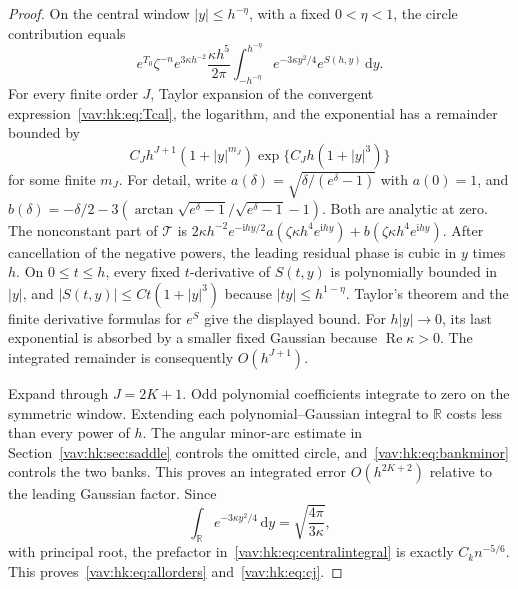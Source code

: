 \documentclass[11pt]{article}
\theoremstyle{remark}\newtheorem{remark}[theorem]{Remark}
\newcommand{\ii}{\mathrm i}
\newcommand{\dd}{\,\mathrm d}
\newcommand{\Rea}{\operatorname{Re}}
\newcommand{\R}{\mathbb R}
\begin{document}
\begin{proof}
On the central window $|y|\leq h^{-\eta}$, with a fixed $0<\eta<1$, the circle contribution equals
\begin{equation}\label{vav:hk:eq:centralintegral}
 e^{T_0}\zeta^{-n}e^{3\kappa h^{-2}}
 \frac{\kappa h^5}{2\pi}
 \int_{-h^{-\eta}}^{h^{-\eta}}
 e^{-3\kappa y^2/4}e^{S(h,y)}\dd y.
\end{equation}
For every finite order $J$, Taylor expansion of the convergent expression~\eqref{vav:hk:eq:Tcal}, the logarithm, and the exponential has a remainder bounded by
\[
 C_Jh^{J+1}(1+|y|^{m_J})
 \exp\{C_Jh(1+|y|^3)\}
\]
for some finite $m_J$. For detail, write $a(\delta)=\sqrt{\delta/(e^\delta-1)}$ with $a(0)=1$, and $b(\delta)=-\delta/2-3(\arctan\sqrt{e^\delta-1}/\sqrt{e^\delta-1}-1)$. Both are analytic at zero. The nonconstant part of $\mathcal T$ is $2\kappa h^{-2}e^{-\ii hy/2}a(\zeta\kappa h^4e^{\ii hy})+b(\zeta\kappa h^4e^{\ii hy})$. After cancellation of the negative powers, the leading residual phase is cubic in $y$ times $h$. On $0\leq t\leq h$, every fixed $t$-derivative of $S(t,y)$ is polynomially bounded in $|y|$, and $|S(t,y)|\leq Ct(1+|y|^3)$ because $|ty|\leq h^{1-\eta}$. Taylor's theorem and the finite derivative formulas for $e^S$ give the displayed bound. For $h|y|\to0$, its last exponential is absorbed by a smaller fixed Gaussian because $\Rea\kappa>0$. The integrated remainder is consequently $O(h^{J+1})$.

Expand through $J=2K+1$. Odd polynomial coefficients integrate to zero on the symmetric window. Extending each polynomial--Gaussian integral to $\R$ costs less than every power of $h$. The angular minor-arc estimate in Section~\ref{vav:hk:sec:saddle} controls the omitted circle, and~\eqref{vav:hk:eq:bankminor} controls the two banks. This proves an integrated error $O(h^{2K+2})$ relative to the leading Gaussian factor. Since
\[
 \int_\R e^{-3\kappa y^2/4}\dd y=\sqrt{\frac{4\pi}{3\kappa}},
\]
with principal root, the prefactor in~\eqref{vav:hk:eq:centralintegral} is exactly $C_kn^{-5/6}$. This proves~\eqref{vav:hk:eq:allorders} and~\eqref{vav:hk:eq:cj}.


\end{proof}
\end{document}
